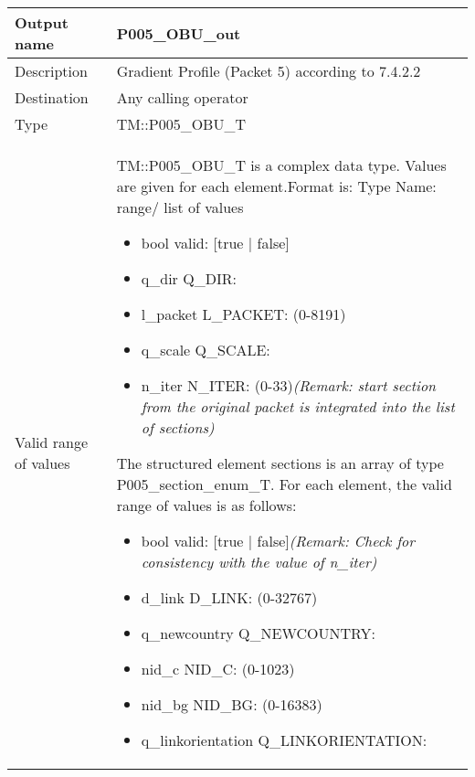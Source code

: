 \begin{longtable}{p{}p{}}
\toprule
Output name				& P005\_OBU\_out \\
\midrule
Description				& Gradient Profile (Packet 5) according to 7.4.2.2 \\
\midrule
Destination				& Any calling operator\\ 
\midrule
Type					& TM::P005\_OBU\_T\\
\midrule
Valid range of values	& TM::P005\_OBU\_T is a complex data type. Values are given for each element.\newline Format is: Type Name: range/ list of values
\begin{itemize}
\item bool valid: [true | false]
\item q\_dir Q\_DIR:
\item l\_packet L\_PACKET: (0-8191)
\item q\_scale Q\_SCALE: 
\item n\_iter N\_ITER: (0-33)\newline \emph{(Remark: start section from the original packet is integrated into the list of sections)}
\end{itemize}
The structured element sections is an array of type P005\_section\_enum\_T. For each element, the valid range of values is as follows:
\begin{itemize}
\item bool valid: [true | false]\newline \emph{(Remark: Check for consistency with the value of n\_iter)}
\item d\_link D\_LINK: (0-32767)
\item q\_newcountry Q\_NEWCOUNTRY:
\item nid\_c NID\_C: (0-1023)
\item nid\_bg NID\_BG: (0-16383)
\item q\_linkorientation Q\_LINKORIENTATION:

\end{itemize}
\end{longtable}
